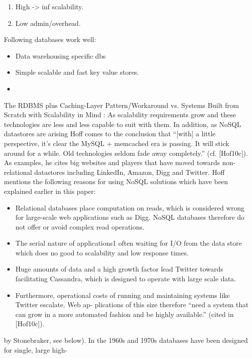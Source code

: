 \documentclass[a4paper,10pt,titlepage=false]{scrreprt}
\begin{document}
\begin{description}
\item[Cloud Computing] \begin{enumerate}
  \item High -> inf scalability. 
  \item Low admin/overhead.
\end{enumerate}
Following databases work well:
\begin{itemize}
  \item Data warehousing specific dbs
  \item Simple scalable and fast key value stores.
 \item %
\end{itemize}
\item The RDBMS plus Caching-Layer Pattern/Workaround vs. Systems Built from Scratch with Scalability in Mind : As scalability requirements grow and these technologies are less and less capable to suit with them. In
addition, as NoSQL datastores are arising Hoff comes to the conclusion that “[with] a little perspective,
it’s clear the MySQL + memcached era is passing. It will stick around for a while. Old technologies
seldom fade away completely.” (cf. [Hof10c]). As examples, he cites big websites and players that have
moved towards non-relational datastores including LinkedIn, Amazon, Digg and Twitter. Hoff mentions
the following reasons for using NoSQL solutions which have been explained earlier in this paper:
\begin{itemize}
  \item  Relational databases place computation on reads, which is considered wrong for large-scale web
applications such as Digg. NoSQL databases therefore do not offer or avoid complex read operations.
\item The serial nature of applications1 often waiting for I/O from the data store which does no good to
scalability and low response times.
\item  Huge amounts of data and a high growth factor lead Twitter towards facilitating Cassandra, which
is designed to operate with large scale data.
\item  Furthermore, operational costs of running and maintaining systems like Twitter escalate. Web ap-
plications of this size therefore “need a system that can grow in a more automated fashion and be
highly available.” (cited in [Hof10c]).
\end{itemize}
\item[Yesterday vs Today]by Stonebraker, see below). In the 1960s and 1970s databases have been designed for single, large high-

\end{description}
\end{document}
